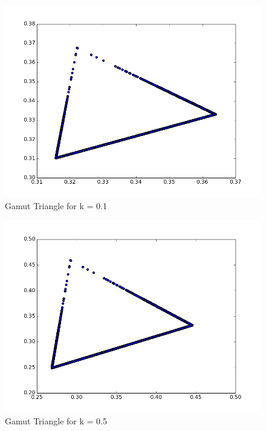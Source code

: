 \documentclass[]{article}
\begin{document}
\begin{figure}[h!]
  \begin{center}
    \includegraphics[scale=0.4]{gamut_triangle_maxsat_normal_0_1}
    \caption[p2]{Gamut Triangle for k = 0.1}
  \end{center}
\end{figure}
\begin{figure}[h!]
  \begin{center}
    \includegraphics[scale=0.4]{gamut_triangle_maxsat_normal_0_5}
    \caption[p3]{Gamut Triangle for k = 0.5}
  \end{center}
\end{figure}
\end{document}
